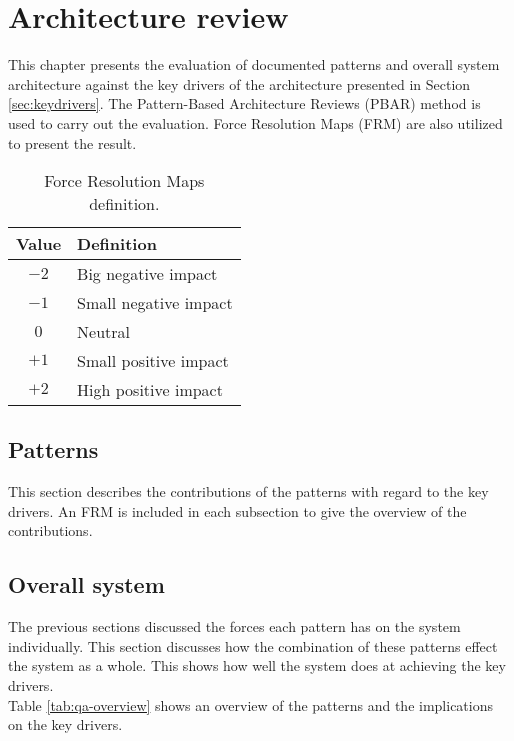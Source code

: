 
\clearpage
\chapter{Architecture review}
\label{ch:archreview}
This chapter presents the evaluation of documented patterns and overall system architecture
against the key drivers of the architecture presented in Section \ref{sec:keydrivers}. The  Pattern-Based Architecture Reviews (PBAR) \cite{pbar} method is used to carry out the
evaluation. Force Resolution Maps (FRM) are also utilized to present the result.

\begin{table}[H]
\centering
\caption{Force Resolution Maps definition.}
\label{tab:frm-table}
\begin{tabular}{cl}
\textbf{Value} & \textbf{Definition} \\ \toprule
            $-2$   & Big negative impact \\
            $-1$   & Small negative impact \\
            $0$    & Neutral \\
            $+1$   & Small positive impact \\
            $+2$   & High positive impact 
\end{tabular}
\end{table}

\section{Patterns}
This section describes the contributions of the patterns with regard to the key
drivers. An FRM is included in each subsection to give the overview of the
contributions.



\section{Overall system}
The previous sections discussed the forces each pattern has on the system individually. This section discusses how the combination of these patterns effect the system as a whole. This shows how well the system does at achieving the key drivers.\\
Table \ref{tab:qa-overview} shows an overview of the patterns and the implications on the key drivers.

